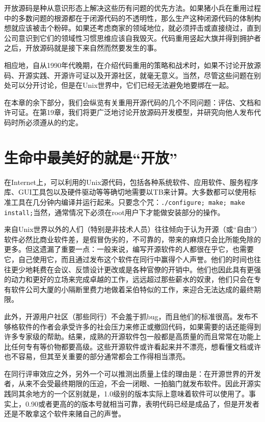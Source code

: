 \documentclass[12pt,oneside]{book}
\begin{document}
开放源码是种从意识形态上解决这些历有问题的优先方法。如果猪小兵在重用过程中的多数问题的根源都在于闭源代码的不透明性，那么生产这种闭源代码的体制构想就应该被击个粉碎。如果还考虑商家的领域地位，就必须抨击或直接绕过，直到公司意识到它们的领域性习惯思维应该自我毁灭。代码重用竖起大旗并得到拥护者之后，开放源码就是接下来自然而然要发生的事。

相应地，自从1990年代晚期，在介绍代码重用的策略和战术时，如果不讨论开放源码、开源实践、开源许可证以及开源社区，就毫无意义。当然，尽管这些问题在别处可以分开讨论，但是在Unix世界中，它们已经无法避免地要绑在一起。

在本章的余下部分，我们会纵览有关重用开源代码的几个不同问题：评估、文档和许可证。在第19章，我们将更广泛地讨论开放源码开发模型，并研究向他人发布代码时所必须遵从的约定。

\section{生命中最美好的就是“开放”}
在Internet上，可以利用的Unix源代码，包括各种系统软件、应用软件、服务程序库、GUI工具包以及硬件驱动等等确切地需要以TB来计算。大多数都可以使用标准工具在几分钟内编译并运行起来。只要念个咒：\verb+./configure; make; make install;+当然，通常情况下必须在root用户下才能做安装部分的操作。

来自Unix世界以外的人们（特别是非技术人员）往往倾向于认为开源（或“自由”）软件必然比商业软件差，是假冒伪劣的，不可靠的，带来的麻烦只会比所能免除的更多。但这遗漏了重要一点：一般来说，编写开源软件的人都很在乎它，也需要它，自己使用它，而且通过发布这个软件在同行中赢得个人声誉。他们的时间也往往更少地耗费在会议、反馈设计更改或是各种官僚的开销中。他们也因此具有更强的动力和更好的立场来完成卓越的工作，远远超过那些薪水的奴隶，他们只会在专有软件公司大厦的小隔断里费力地做着呆伯特似的工作，来迎合无法达成的最终期限。

此外，开源用户社区（那些同行）不会羞于抓bug，而且他们的标准很高。发布不够格软件的作者会承受许多的社会压力来修正或撤回代码，如果需要的话还能得到许多专家级的帮助。结果，成熟的开源软件包一般都是高质量的而且常常在功能上比任何专有等价物都要高级。这些开源软件或许看起来并不漂亮，想看懂文档或许也不容易，但其至关重要的部分通常都会工作得相当漂亮。

在同行评审效应之外，另外一个可以推测出质量上佳的理由是：在开源世界的开发者，从来不会受最终期限的压迫，不会一闭眼、一拍脑门就发布软件。因此开源实践同其余地方的一个区别就是，1.0级别的版本实际上意味着软件可以使用了。事实上，0.90或者更高的的版本号就相当可靠，表明代码已经是成品了，但是开发者还是不敢拿这个软件来赌自己的声誉。
\end{document}
